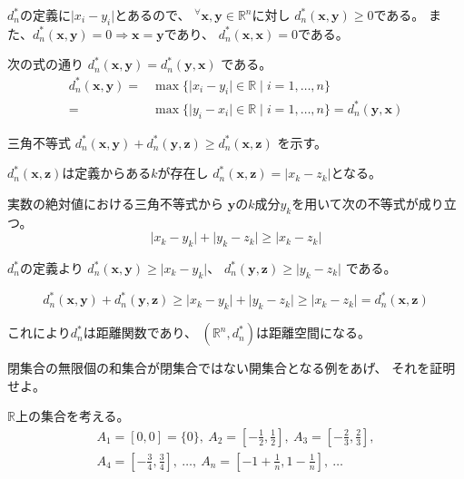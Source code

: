 \documentclass[12pt,b5paper]{ltjsarticle}
\begin{document}
\dotfill

$d_n^*$の定義に$\lvert x_i-y_i \rvert$とあるので、
${}^{\forall}\bm{x},\bm{y}\in\mathbb{R}^n$に対し
$d_n^*(\bm{x},\bm{y})\geq 0$である。
また、$d_n^*(\bm{x},\bm{y})=0 \Rightarrow \bm{x}=\bm{y}$であり、
$d_n^*(\bm{x},\bm{x})=0$である。

次の式の通り
$d_n^*(\bm{x},\bm{y})= d_n^*(\bm{y},\bm{x})$
である。
\begin{align}
 d_n^*(\bm{x},\bm{y})
  =& \max\{ \lvert x_i-y_i \lvert \in\mathbb{R} \mid i=1,\dots,n \}\\
  =& \max\{ \lvert y_i-x_i \lvert \in\mathbb{R} \mid i=1,\dots,n \}
  =d_n^*(\bm{y},\bm{x})
\end{align}

三角不等式
$d_n^*(\bm{x},\bm{y}) + d_n^*(\bm{y},\bm{z}) \geq d_n^*(\bm{x},\bm{z})$
を示す。


$d_n^*(\bm{x},\bm{z})$は定義からある$k$が存在し
$d_n^*(\bm{x},\bm{z}) = \lvert x_{k}-z_{k} \rvert$となる。

実数の絶対値における三角不等式から
$\bm{y}$の$k$成分$y_{k}$を用いて次の不等式が成り立つ。
\begin{equation}
 \lvert x_{k} - y_{k} \rvert +   \lvert y_{k} - z_{k} \rvert
 \geq \lvert x_{k}-z_{k} \rvert
\end{equation}

$d_n^{*}$の定義より
$d_n^{*}(\bm{x},\bm{y}) \geq \lvert x_{k} - y_{k} \rvert$、
$d_n^{*}(\bm{y},\bm{z}) \geq \lvert y_{k} - z_{k} \rvert$
である。

\begin{equation}
 d_n^{*}(\bm{x},\bm{y}) + d_n^{*}(\bm{y},\bm{z})
 \geq \lvert x_{k} - y_{k} \rvert + \lvert y_{k} - z_{k} \rvert
 \geq \lvert x_{k} - z_{k} \rvert
 = d_n^*(\bm{x},\bm{z})
\end{equation}

これにより$d_n^{*}$は距離関数であり、
$(\mathbb{R}^n,d_n^{*})$は距離空間になる。



\hrulefill

閉集合の無限個の和集合が閉集合ではない開集合となる例をあげ、
それを証明せよ。

\dotfill


$\mathbb{R}$上の集合を考える。
\begin{gather}
 A_1=[0,0]=\{0\},\
 A_2=\left[-\frac{1}{2},\frac{1}{2}\right],\
 A_3=\left[-\frac{2}{3},\frac{2}{3}\right],\\
 A_4=\left[-\frac{3}{4},\frac{3}{4}\right],\
  \dots,\
  A_n=\left[-1+\frac{1}{n},1-\frac{1}{n}\right],\
 \dots
\end{gather}
\end{document}

